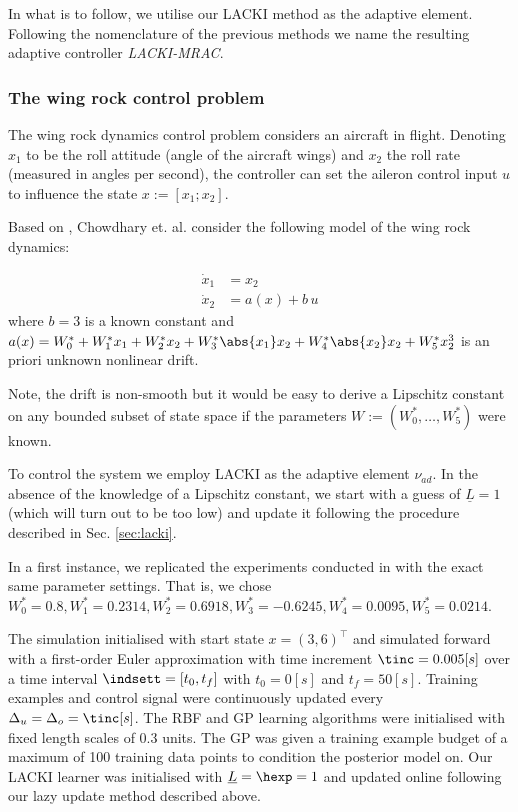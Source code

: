 In what is to follow, we utilise our LACKI method as the adaptive element. Following the nomenclature of the previous methods we name the resulting adaptive controller \textit{LACKI-MRAC}.

\subsubsection{The wing rock control problem}
The wing rock dynamics control problem considers an aircraft in flight. Denoting $x_1$ to be the roll attitude (angle of the aircraft wings) and $x_2$ the roll rate (measured in angles per second), the controller can set the aileron control input $u$ to influence the state $x := [x_1;x_2]$.

Based on \cite{Monahemi1996}, Chowdhary et. al. \cite{Chowdhary2013,ChowdharyCDC2013} consider the following model of the wing rock dynamics: 

\begin{align}
\dot x_1 &= x_2 \\
\dot x_2 &= a(x) + b \, u 
\end{align}
where $b =3$ is a known constant and 
$a(x) = W_0^* + W_1^* x_1 + W_2^* x_2 + W_3^* \abs{x_1} x_2 + W_4^* \abs{x_2} x_2 + W^*_5 x_2^3$ is an priori unknown nonlinear drift. 



Note, the drift is non-smooth but it would be easy to derive a Lipschitz constant on any bounded subset of state space if the parameters $W := (W_0^*,\ldots, W_5^*)$ were known.

To control the system we employ LACKI as the adaptive element $\nu_{ad}$.
In the absence of the knowledge of a Lipschitz constant, we start with a guess of $\underline L=1$ (which will turn out to be too low) and update it following the procedure described in Sec. \ref{sec:lacki}.

In a first instance, we replicated the experiments conducted in \cite{Chowdhary2013,chowdharyacc2013} with the exact same parameter settings. That is, we chose $W_0^* = 0.8, W_1^* = 0.2314, W_2^* = 0.6918, W_3^* = -0.6245, W_4^* = 0.0095, W_5^* = 0.0214$. 



The simulation initialised with start state $x = (3,6)^\top$ and simulated forward with a first-order Euler approximation with time increment $\tinc = 0.005 [s]$ over a time interval $\indsett = [t_0,t_f]$ with $t_0 = 0[s]$ and $t_f = 50[s]$. Training examples and control signal were continuously updated every $\Delta_u= \Delta_o = \tinc [s]$. The RBF and GP learning algorithms were initialised with fixed length scales of 0.3 units. The GP was given a training example budget of a maximum of 100 training data points to condition the posterior model on. Our LACKI learner was initialised with $\underline L =\hexp= 1$ and updated online following our lazy update method described above.

